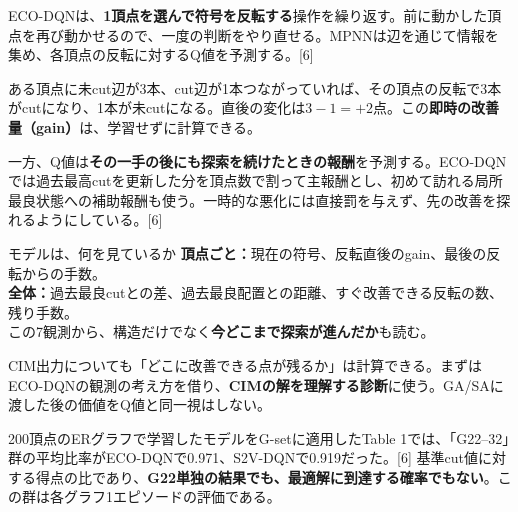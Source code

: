 \newpage
{}
ECO-DQNは、\textbf{1頂点を選んで符号を反転する}操作を繰り返す。前に動かした頂点を再び動かせるので、一度の判断をやり直せる。MPNNは辺を通じて情報を集め、各頂点の反転に対するQ値を予測する。[6]

\begin{center}
\end{center}

ある頂点に未cut辺が3本、cut辺が1本つながっていれば、その頂点の反転で3本がcutになり、1本が未cutになる。直後の変化は$3-1=+2$点。この\textbf{即時の改善量（gain）}は、学習せずに計算できる。

一方、Q値は\textbf{その一手の後にも探索を続けたときの報酬}を予測する。ECO-DQNでは過去最高cutを更新した分を頂点数で割って主報酬とし、初めて訪れる局所最良状態への補助報酬も使う。一時的な悪化には直接罰を与えず、先の改善を探れるようにしている。[6]

\begin{point}{モデルは、何を見ているか}
\textbf{頂点ごと：}現在の符号、反転直後のgain、最後の反転からの手数。\\
\textbf{全体：}過去最良cutとの差、過去最良配置との距離、すぐ改善できる反転の数、残り手数。\\[1mm]
この7観測から、構造だけでなく\textbf{今どこまで探索が進んだか}も読む。
\end{point}
CIM出力についても「どこに改善できる点が残るか」は計算できる。まずはECO-DQNの観測の考え方を借り、\textbf{CIMの解を理解する診断}に使う。GA/SAに渡した後の価値をQ値と同一視はしない。

\newpage
{}
200頂点のERグラフで学習したモデルをG-setに適用したTable 1では、「G22--32」群の平均比率がECO-DQNで0.971、S2V-DQNで0.919だった。[6] 基準cut値に対する得点の比であり、\textbf{G22単独の結果でも、最適解に到達する確率でもない}。この群は各グラフ1エピソードの評価である。


